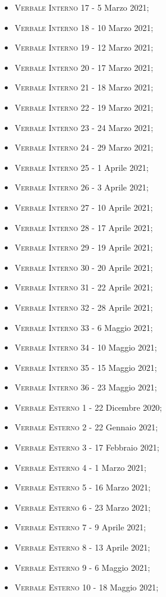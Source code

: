 \documentclass[10pt,stdletter,dateno,sigright]{newlfm}  %
\begin{document}
\begin{newlfm}
\begin{multicols}{2}
\begin{itemize}
            \item \textsc{Verbale Interno 17} - 5 Marzo 2021;
            \item \textsc{Verbale Interno 18} - 10 Marzo 2021;
            \item \textsc{Verbale Interno 19} - 12 Marzo 2021;
            \item \textsc{Verbale Interno 20} - 17 Marzo 2021;
            \item \textsc{Verbale Interno 21} - 18 Marzo 2021;
            \item \textsc{Verbale Interno 22} - 19 Marzo 2021;
            \item \textsc{Verbale Interno 23} - 24 Marzo 2021;
            \item \textsc{Verbale Interno 24} - 29 Marzo 2021;
            \item \textsc{Verbale Interno 25} - 1 Aprile 2021;
            \item \textsc{Verbale Interno 26} - 3 Aprile 2021;
            \item \textsc{Verbale Interno 27} - 10 Aprile 2021;
            \item \textsc{Verbale Interno 28} - 17 Aprile 2021;
            \item \textsc{Verbale Interno 29} - 19 Aprile 2021;
            \item \textsc{Verbale Interno 30} - 20 Aprile 2021;
            \item \textsc{Verbale Interno 31} - 22 Aprile 2021;
                \item \textsc{Verbale Interno 32} - 28 Aprile 2021;
                \item \textsc{Verbale Interno 33} - 6 Maggio 2021;
                \item \textsc{Verbale Interno 34} - 10 Maggio 2021;
                \item \textsc{Verbale Interno 35} - 15 Maggio 2021;
               \item \textsc{Verbale Interno 36} - 23 Maggio 2021;
               \item \textsc{Verbale Esterno 1} - 22 Dicembre 2020;
               \item \textsc{Verbale Esterno 2} - 22 Gennaio 2021;
            \item \textsc{Verbale Esterno 3} - 17 Febbraio 2021;
            \item \textsc{Verbale Esterno 4} - 1 Marzo 2021;
            \item \textsc{Verbale Esterno 5} - 16 Marzo 2021;
            \item \textsc{Verbale Esterno 6} - 23 Marzo 2021;
            \item \textsc{Verbale Esterno 7} - 9 Aprile 2021;
            \item \textsc{Verbale Esterno 8} - 13 Aprile 2021;
            \item \textsc{Verbale Esterno 9} - 6 Maggio 2021;
                \item \textsc{Verbale Esterno 10} - 18 Maggio 2021;
            \end{itemize}
        \end{multicols}


\end{newlfm}
\end{document}
